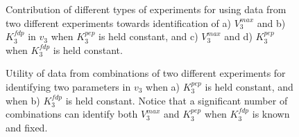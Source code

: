 \documentclass[10pt]{article}
\begin{document}
	\begin{figure}[!tbhp]
		\caption{Contribution of different types of experiments for using data from two different experiments towards identification of a) $V_3^{max}$ and b) $K_3^{fdp}$ in $v_3$ when $K_3^{pep}$ is held constant, and c) $V_3^{max}$ and d) $K_3^{pep}$ when $K_3^{fdp}$ is held constant.}%
	\end{figure}	

	\begin{figure}[!tbhp]
		\caption{Utility of data from combinations of two different experiments for identifying two parameters in $v_3$ when a) $K_3^{pep}$ is held constant, and when b) $K_3^{fdp}$ is held constant. Notice that a significant number of combinations can identify both $V_3^{max}$ and $K_3^{pep}$ when $K_3^{fdp}$ is known and fixed.}%
	\end{figure}	
\end{document}
